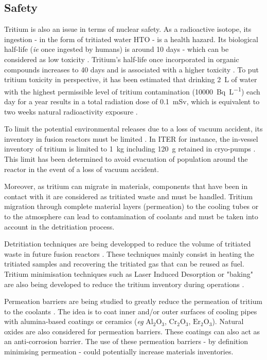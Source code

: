 \subsection{Safety}
Tritium is also an issue in terms of nuclear safety.
As a radioactive isotope, its ingestion - in the form of tritiated water HTO - is a health hazard.
Its biological half-life (\textit{ie} once ingested by humans) is around 10 days - which can be considered as low toxicity .
Tritium's half-life once incorporated in organic compounds increases to 40 days and is associated with a higher toxicity \cite{bridges_review_2007}.
To put tritium toxicity in perspective, it has been estimated that drinking \SI{2}{L} of water with the highest permissible level of tritium contamination (\SI{10000}{Bq.L^{-1}}) each day for a year results in a total radiation dose of \SI{0.1}{mSv}, which is equivalent to two weeks natural radioactivity exposure .

To limit the potential environmental releases due to a loss of vacuum accident, its inventory in fusion reactors must be limited .
In ITER for instance, the in-vessel inventory of tritium is limited to \SI{1}{kg} including \SI{120}{g} retained in cryo-pumps .
This limit has been determined to avoid evacuation of population around the reactor in the event of a loss of vacuum accident.

Moreover, as tritium can migrate in materials, components that have been in contact with it are considered as tritiated waste and must be handled.
Tritium migration through complete material layers (permeation) to the cooling tubes  or to the atmosphere can lead to contamination of coolants and must be taken into account in the detritiation process.

Detritiation techniques are being developped to reduce the volume of tritiated waste in future fusion reactors .
These techniques mainly consist in heating the tritiated samples and recovering the tritiated gas  that can be reused as fuel.
Tritium minimisation techniques such as Laser Induced Desorption or "baking" are also being developed to reduce the tritium inventory during operations .

Permeation barriers are being studied to greatly reduce the permeation of tritium to the coolants .
The idea is to coat inner and/or outer surfaces of cooling pipes with alumina-based coatings or ceramics (\textit{eg} $\mathrm{Al_2 O_3}$, $\mathrm{Cr_2 O_3}$, $\mathrm{Er_2 O_3}$).
Natural oxides are also considered for permeation barriers.
These coatings can also act as an anti-corrosion barrier.
The use of these permeation barriers - by definition minimising permeation - could potentially increase materials inventories.

